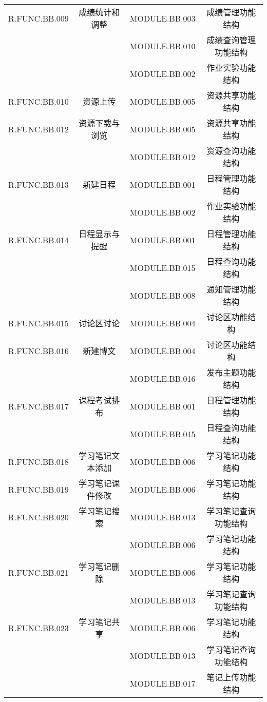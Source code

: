 \begin{longtable}{|c|c|c|c|}
R.FUNC.BB.009   &   成绩统计和调整   &    MODULE.BB.003   &   成绩管理功能结构     \\
    &   &   MODULE.BB.010   &   成绩查询管理功能结构  \\
    &   &   MODULE.BB.002  &  作业实验功能结构  \\ 

R.FUNC.BB.010   &   资源上传   &    MODULE.BB.005   &   资源共享功能结构   \\

R.FUNC.BB.012   &   资源下载与浏览   &   MODULE.BB.005   &   资源共享功能结构   \\
    &   &   MODULE.BB.012  &  资源查询功能结构  \\

R.FUNC.BB.013   &   新建日程   &   MODULE.BB.001  &  日程管理功能结构   \\
    &   &   MODULE.BB.002  &  作业实验功能结构 \\

R.FUNC.BB.014   &   日程显示与提醒   &   MODULE.BB.001  &  日程管理功能结构   \\
    &   &   MODULE.BB.015  &  日程查询功能结构  \\
    &   &   MODULE.BB.008  &  通知管理功能结构  \\

R.FUNC.BB.015   &   讨论区讨论   &  MODULE.BB.004   & 讨论区功能结构   \\

R.FUNC.BB.016   &   新建博文   &   MODULE.BB.004  &  讨论区功能结构   \\
    &   &   MODULE.BB.016  &  发布主题功能结构  \\  

R.FUNC.BB.017   &   课程考试排布   &   MODULE.BB.001  &  日程管理功能结构   \\
    &   &   MODULE.BB.015  &  日程查询功能结构  \\

R.FUNC.BB.018   &   学习笔记文本添加   &   MODULE.BB.006  &  学习笔记功能结构    \\

R.FUNC.BB.019   &   学习笔记课件修改   &   MODULE.BB.006  &  学习笔记功能结构   \\

R.FUNC.BB.020   &   学习笔记搜索   &   MODULE.BB.013  &  学习笔记查询功能结构   \\
    &   &   MODULE.BB.006  &  学习笔记功能结构    \\

R.FUNC.BB.021   &   学习笔记删除   &   MODULE.BB.006  &  学习笔记功能结构   \\
    &   &   MODULE.BB.013  &  学习笔记查询功能结构   \\

R.FUNC.BB.023   &   学习笔记共享   &   MODULE.BB.006  &  学习笔记功能结构 \\
    &   &   MODULE.BB.013  &  学习笔记查询功能结构   \\
    &   &   MODULE.BB.017  &  笔记上传功能结构  \\



\end{longtable}